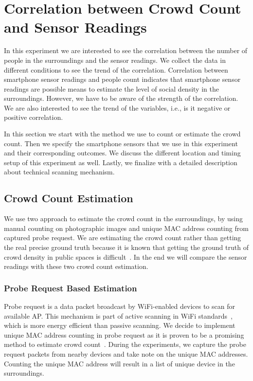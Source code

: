 \section{Correlation between Crowd Count and Sensor Readings} %
\label{sec:crowd_count_correlation}
In this experiment we are interested to see the correlation between the number of people in the surroundings and the sensor readings. We collect the data in different conditions to see the trend of the correlation. Correlation between smartphone sensor readings and people count indicates that smartphone sensor readings are possible means to estimate the level of social density in the surroundings. However, we have to be aware of the strength of the correlation. We are also interested to see the trend of the variables, i.e., is it negative or positive correlation.

In this section we start with the method we use to count or estimate the crowd count. Then we specify the smartphone sensors that we use in this experiment and their corresponding outcomes. We discuss the different location and timing setup of this experiment as well. Lastly, we finalize with a detailed description about technical scanning mechanism.


\subsection{Crowd Count Estimation} %
\label{sub:crowd_count_estimation}
We use two approach to estimate the crowd count in the surroundings, by using manual counting on photographic images and unique \ac{MAC} address counting from captured probe request. We are estimating the crowd count rather than getting the real precise ground truth because it is known that getting the ground truth of crowd density in public spaces is difficult~\cite{thesis041}. In the end we will compare the sensor readings with these two crowd count estimation.

	\subsubsection{Probe Request Based Estimation} %
	\label{ssub:probe_request_based_estimation}
	Probe request is a data packet broadcast by WiFi-enabled devices to scan for available \ac{AP}. This mechanism is part of active scanning in WiFi standards~\cite{thesis082}, which is more energy efficient than passive scanning. We decide to implement unique \ac{MAC} address counting in probe request as it is proven to be a promising method to estimate crowd count~\cite{thesis047}. During the experiments, we capture the probe request packets from nearby devices and take note on the unique \ac{MAC} addresses. Counting the unique \ac{MAC} address will result in a list of unique device in the surroundings.


